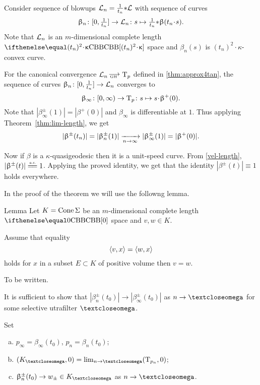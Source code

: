 Consider sequence of blowups $\mathcal{L}_n=\frac{1}{t_n}{*} \mathcal{L}$ with sequence of 
curves 
$$\beta_n\:[0,\tfrac1{t_n}]\to \spc{L}_n\:s\z\mapsto\tfrac{1}{t_n}\blow \beta(t_n\cdot s).$$
Note that $\mathcal{L}_n$  is an $m$-dimensional complete length $\Alex{(t_n)^2\cdot\kappa}$ space
and $\beta_n(s)$ is $(t_n)^2\cdot\kappa$-convex curve. 

For the canonical convergence $\spc{L}_n\GHto \T_p$ defined in \ref{thm:approx4tan},
the sequence of curves $\beta_n\:[0,\tfrac1{t_n}]\to \spc{L}_n$ converges to 
$$\beta_\infty\:[0,\infty)\to\T_p\:s\mapsto
s\cdot \beta^+(0).
$$
Note that $|\beta_\infty^\pm(1)|=|\beta^+(0)|$ and $\beta_\infty$ is differentiable at $1$.
Thus applying Theorem~\ref{thm:lim-length}, 
we get 
\[|\beta^\pm(t_n)|
=
|\beta_n^\pm(1)|
\xto[n\to\infty]{}
|\beta^\pm_\infty(1)|
=
|\beta^+(0)|.
\]

Now if $\beta$ is a $\kappa$-quasigeodesic then it is a unit-speed curve.
From \ref{vel-length}, $|\beta^\pm(t)|\ae 1$.
Applying the proved identity, we get that the identity $|\beta^\pm(t)|\equiv1$ holds everywhere.
\qeds

In the proof of the theorem we will use the followng lemma.


\begin{thm}{Lemma}\label{lem:<x,v>=<x,w> => v=w}
Let $K=\mathop{\rm Cone}\nolimits\Sigma$ be an $m$-dimensional complete length $\Alex0$ space and $v,w\in K$.

Assume that equality 
\[\langle v,x\rangle=\langle w,x\rangle\]
holds for $x$ in a subset $E\subset K$ of positive volume
then $v=w$.
\end{thm}

 To be written.%
\qeds



It is sufficient to show that 
$|\beta_n^\pm(t_0)|\to |\beta_\infty^\pm(t_0)|$ as $n\to\o$
for some selective utrafilter $\o$.

Set 
\begin{enumerate}[(a)]
\item $p_\infty=\beta_\infty(t_0)$, $p_n=\beta_n(t_0)$;
\item $(K_\o,0)=\lim_{n\to\o}(\T_{p_n},0)$;
\item\label{beta->w} $\beta_n^\pm(t_0)\to w_\pm\in K_\o$ as $n\to\o$.
\end{enumerate}

